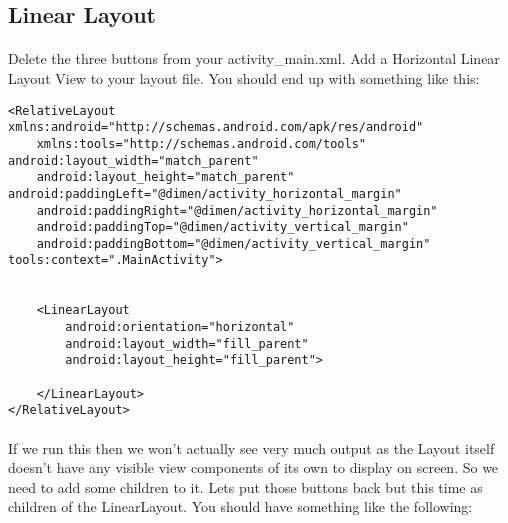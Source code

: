 \subsection{Linear Layout}
\paragraph{} Delete the three buttons from your activity\_main.xml. Add a Horizontal Linear Layout View to your layout file. You should end up with something like this:

\begin{lstlisting}
<RelativeLayout xmlns:android="http://schemas.android.com/apk/res/android"
    xmlns:tools="http://schemas.android.com/tools" android:layout_width="match_parent"
    android:layout_height="match_parent" android:paddingLeft="@dimen/activity_horizontal_margin"
    android:paddingRight="@dimen/activity_horizontal_margin"
    android:paddingTop="@dimen/activity_vertical_margin"
    android:paddingBottom="@dimen/activity_vertical_margin" tools:context=".MainActivity">


    <LinearLayout
        android:orientation="horizontal"
        android:layout_width="fill_parent"
        android:layout_height="fill_parent">
        
    </LinearLayout>
</RelativeLayout>
\end{lstlisting}
\paragraph{} If we run this then we won't actually see very much output as the Layout itself doesn't have any visible view components of its own to display on screen. So we need to add some children to it. Lets put those buttons back but this time as children of the LinearLayout. You should have something like the following:

